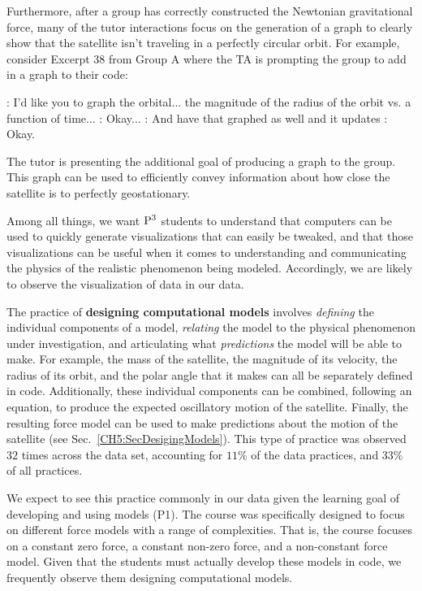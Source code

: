 \documentclass{msuphddissertation}
\begin{document}
\begin{doublespace}
Furthermore, after a group has correctly constructed the Newtonian gravitational force, many of the tutor interactions focus on the generation of a graph to clearly show that the satellite isn't traveling in a perfectly circular orbit.  For example, consider Excerpt 38 from Group A where the TA is prompting the group to add in a graph to their code: \begin{description}
\TA: I'd like you to graph the orbital... the magnitude of the radius of the orbit vs. a function of time...
\SC: Okay...
\TA: And have that graphed as well and it updates
\SC: Okay.
\end{description}  The tutor is presenting the additional goal of producing a graph to the group.  This graph can be used to efficiently convey information about how close the satellite is to perfectly geostationary.  

Among all things, we want ${\rm P}^{3}$ students to understand that computers can be used to quickly generate visualizations that can easily be tweaked, and that those visualizations can be useful when it comes to understanding and communicating the physics of the realistic phenomenon being modeled.  Accordingly, we are likely to observe the visualization of data in our data.

The practice of \textbf{designing computational models} involves \textit{defining} the individual components of a model, \textit{relating} the model to the physical phenomenon under investigation, and articulating what \textit{predictions} the model will be able to make.  For example, the mass of the satellite, the magnitude of its velocity, the radius of its orbit, and the polar angle that it makes can all be separately defined in code.  Additionally, these individual components can be combined, following an equation, to produce the expected oscillatory motion of the satellite.  Finally, the resulting force model can be used to make predictions about the motion of the satellite (see Sec.~\ref{CH5:SecDesigingModels}).  This type of practice was observed $32$ times across the data set, accounting for $11\%$ of the data practices, and $33\%$ of all practices.

We expect to see this practice commonly in our data given the learning goal of developing and using models (P1).  The course was specifically designed to focus on different force models with a range of complexities.  That is, the course focuses on a constant zero force, a constant non-zero force, and a non-constant force model.  Given that the students must actually develop these models in code, we frequently observe them designing computational models.


\end{doublespace}
\end{document}
